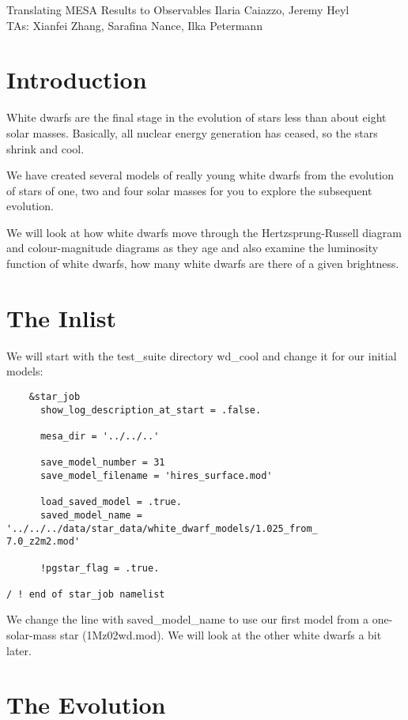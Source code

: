 \documentclass{article}
\begin{document}
\begin{titlebox}{Translating MESA Results to Observables}
Ilaria Caiazzo, Jeremy Heyl \\
TAs: Xianfei Zhang, Sarafina Nance, Ilka Petermann
\end{titlebox}

\section{Introduction}

White dwarfs are the final stage in the evolution of stars less than about eight solar masses.  Basically, all nuclear energy generation has ceased, so the stars shrink and cool.  

We have created several models of really young white dwarfs from the evolution of stars of one, two and four solar masses for you to explore the subsequent evolution.

We will look at how white dwarfs move through the Hertzsprung-Russell diagram and colour-magnitude diagrams as they age and also examine the luminosity function of white dwarfs, how many white dwarfs are there of a given brightness.

\section{The Inlist}

We will start with the test\_suite directory wd\_cool and change it for our initial models: 
\begin{verbatim}
    &star_job
      show_log_description_at_start = .false.

      mesa_dir = '../../..'

      save_model_number = 31
      save_model_filename = 'hires_surface.mod'

      load_saved_model = .true.
      saved_model_name = '../../../data/star_data/white_dwarf_models/1.025_from_
7.0_z2m2.mod'

      !pgstar_flag = .true.

/ ! end of star_job namelist
\end{verbatim}
We change the line with saved\_model\_name to use our first model from a one-solar-mass star (1Mz02wd.mod).  We will look at the other white dwarfs a bit later.

\section{The Evolution}
\end{document}
